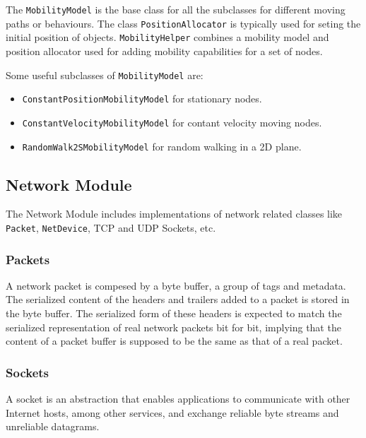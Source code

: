 The \texttt{MobilityModel} is the base class for all the subclasses for different moving paths or behaviours.
The class \texttt{PositionAllocator} is typically used for seting the initial position of objects. \texttt{MobilityHelper}
combines a mobility model and position allocator used for adding mobility capabilities for a set 
of nodes.

Some useful subclasses of \texttt{MobilityModel} are:
\begin{itemize}[noitemsep, topsep=0pt]
  \item \texttt{ConstantPositionMobilityModel} for stationary nodes.
  \item \texttt{ConstantVelocityMobilityModel} for contant velocity moving nodes.
  \item \texttt{RandomWalk2SMobilityModel} for random walking in a 2D plane.
\end{itemize}


\subsection{Network Module}
The Network Module includes implementations of network related classes like 
\texttt{Packet}, \texttt{NetDevice}, TCP and UDP Sockets, etc.

\subsubsection{Packets}
A network packet is compesed by a byte buffer, a group of tags and metadata.
The serialized content of the headers and trailers added to a packet is stored in the byte buffer. 
The serialized form of these headers is expected to match the serialized representation of real 
network packets bit for bit, implying that the content of a packet buffer is supposed to be the 
same as that of a real packet.

\subsubsection{Sockets}
A socket is an abstraction that enables applications to communicate with other Internet hosts, among other services,
and exchange reliable byte streams and unreliable datagrams.

